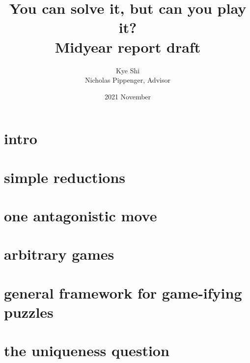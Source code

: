 \documentclass{midyear-report}
\title{You can solve it, but can you play it?\\Midyear report draft}
\author{Kye Shi\\Nicholas Pippenger, Advisor}
\date{2021 November}
\begin{document}
\maketitle

\section*{intro}

\section*{simple reductions}

\section*{one antagonistic move}

\section*{arbitrary games}

\section*{general framework for game-ifying puzzles}

\section*{the uniqueness question}
\end{document}
